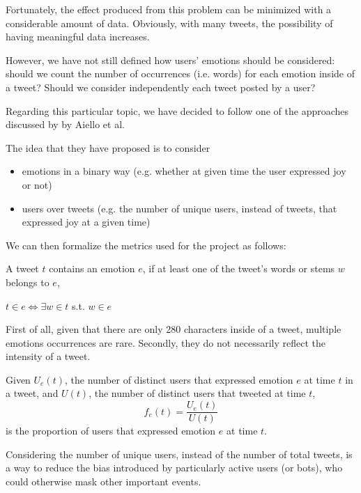 Fortunately, the effect produced from this problem can be minimized with a considerable amount of data. Obviously, with many tweets, the possibility of having meaningful data increases.

However, we have not still defined how users' emotions should be considered: should we count the number of occurrences (i.e. words) for each emotion inside of a tweet? Should we consider independently each tweet posted by a user?

Regarding this particular topic, we have decided to follow one of the approaches discussed by  by Aiello et al.~\cite{aiello2020epidemic}

The idea that they have proposed is to consider
	
\begin{itemize}
	\item emotions in a binary way (e.g. whether at given time the user expressed joy or not)
	\item users over tweets (e.g. the number of unique users, instead of tweets, that expressed joy at a given time)
\end{itemize}

We can then formalize the metrics used for the project as follows:

\begin{definition}
\label{def:tweet-emotions}
	A tweet \(t\) contains an emotion \(e\), if at least one of the tweet's words or stems \(w\) belongs to \(e\),
	\begin{center}
		\(t \in e \Leftrightarrow \exists w \in t\)  s.t. \(w \in e\)
	\end{center}
\end{definition}

First of all, given that there are only 280 characters inside of a tweet, multiple emotions occurrences are rare. Secondly, they do not necessarily reflect the intensity of a tweet. 
	
\begin{definition}
\label{def:user-emotions}
	Given \(U_e(t)\), the number of distinct users that expressed emotion \(e\) at time \(t\) in a tweet, and \(U(t)\), the number of distinct users that tweeted at time \(t\),
	\[f_e(t) = \frac{U_e(t)}{U(t)}\]
	is the proportion of users that expressed emotion \(e\) at time \(t\).	
\end{definition}

Considering the number of unique users, instead of the number of total tweets, is a way to reduce the bias introduced by particularly active users (or bots), who could otherwise mask other important events.

